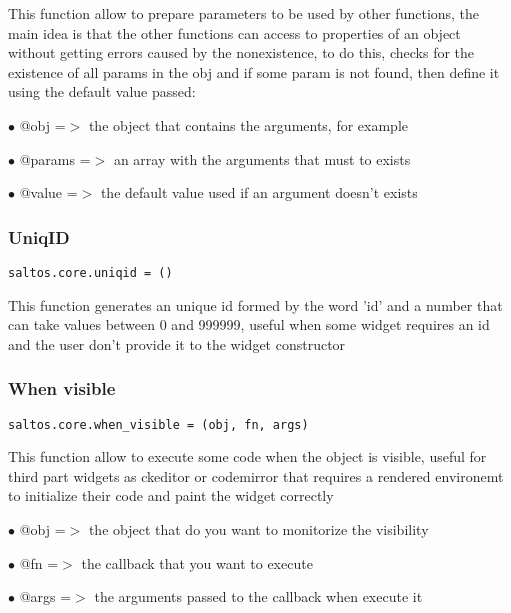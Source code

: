 \documentclass[a4paper]{article}
\begin{document}
This function allow to prepare parameters to be used by other functions, the main idea
is that the other functions can access to properties of an object without getting errors
caused by the nonexistence, to do this, checks for the existence of all params in the obj
and if some param is not found, then define it using the default value passed:

\begin{compactitem}
\item[\color{myblue}$\bullet$] @obj    =$>$ the object that contains the arguments, for example
\item[\color{myblue}$\bullet$] @params =$>$ an array with the arguments that must to exists
\item[\color{myblue}$\bullet$] @value  =$>$ the default value used if an argument doesn't exists
\end{compactitem}

\hypertarget{toc697}{}
\subsubsection{UniqID}

\begin{lstlisting}
saltos.core.uniqid = ()
\end{lstlisting}

This function generates an unique id formed by the word 'id' and a number that can take
values between 0 and 999999, useful when some widget requires an id and the user don't
provide it to the widget constructor

\hypertarget{toc698}{}
\subsubsection{When visible}

\begin{lstlisting}
saltos.core.when_visible = (obj, fn, args)
\end{lstlisting}

This function allow to execute some code when the object is visible, useful for third part
widgets as ckeditor or codemirror that requires a rendered environemt to initialize their
code and paint the widget correctly

\begin{compactitem}
\item[\color{myblue}$\bullet$] @obj  =$>$ the object that do you want to monitorize the visibility
\item[\color{myblue}$\bullet$] @fn   =$>$ the callback that you want to execute
\item[\color{myblue}$\bullet$] @args =$>$ the arguments passed to the callback when execute it
\end{compactitem}
\end{document}
